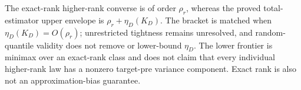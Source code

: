 The exact-rank higher-rank converse is of order \(\rho_r\), whereas the proved total-estimator upper envelope is \(\rho_r+\eta_D(K_D)\). The bracket is matched when \(\eta_D(K_D)=O(\rho_r)\); unrestricted tightness remains unresolved, and random-quantile validity does not remove or lower-bound \(\eta_D\). The lower frontier is minimax over an exact-rank class and does not claim that every individual higher-rank law has a nonzero target-pre variance component. Exact rank is also not an approximation-bias guarantee.